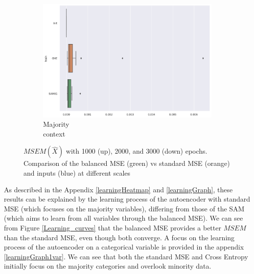 \documentclass{article}
\def \w {\widehat}
\theoremstyle{definition}
\begin{document}
\begin{figure}[ht]
\begin{subfigure}[b]{0.15\textwidth}
         \quad
         \includegraphics[width=\textwidth]{imgs/Illu/3000Epochs/Majo/Boxplots_MSEM.png}
         \caption{Majority \\ context}
         \label{MSEM_Majo_X}
     \end{subfigure}
     \caption{$MSEM(\w X)$ with 1000 (up), 2000, and 3000 (down) epochs. Comparison of the balanced MSE (green) vs standard MSE (orange) and inputs (blue) at different scales } 
     \label{Boxplots_MSEM}
\end{figure}

As described in the Appendix \ref{learningHeatmap} and \ref{learningGraph}, these results can be explained by the learning process of the autoencoder with standard MSE (which focuses on the majority variables), differing from those of the SAM (which aims to learn from all variables through the balanced MSE). We can see from Figure \ref{Learning_curves} that the balanced  MSE provides a better $MSEM$ than the standard MSE, even though both converge. A focus on the learning process of the autoencoder on a categorical variable is provided in the appendix \ref{learningGraph1var}. We can see that both the standard MSE and Cross Entropy initially focus on the majority categories and overlook minority data.
\end{document}
